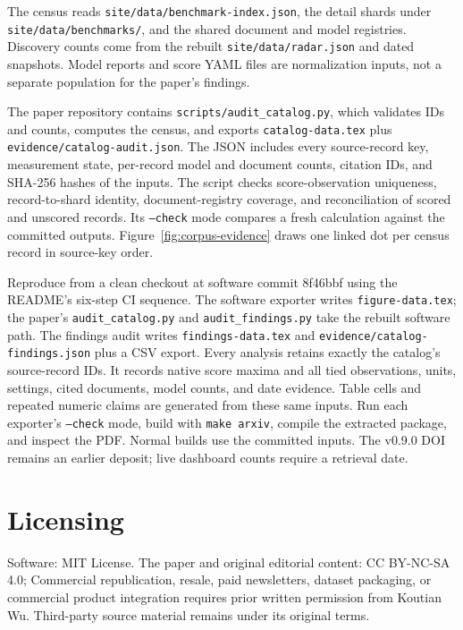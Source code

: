 \documentclass[11pt]{article}
\newcommand{\gitcommit}{8f46bbf}
\begin{document}
The census reads \texttt{site/data/benchmark-index.json}, the detail shards under \texttt{site/data/benchmarks/}, and the shared document and model registries. Discovery counts come from the rebuilt \texttt{site/data/radar.json} and dated snapshots. Model reports and score YAML files are normalization inputs, not a separate population for the paper's findings.

The paper repository contains \texttt{scripts/audit\_catalog.py}, which validates IDs and counts, computes the census, and exports \texttt{catalog-data.tex} plus \texttt{evidence/catalog-audit.json}. The JSON includes every source-record key, measurement state, per-record model and document counts, citation IDs, and SHA-256 hashes of the inputs. The script checks score-observation uniqueness, record-to-shard identity, document-registry coverage, and reconciliation of scored and unscored records. Its \texttt{--check} mode compares a fresh calculation against the committed outputs. Figure~\ref{fig:corpus-evidence} draws one linked dot per census record in source-key order.

Reproduce from a clean checkout at software commit \gitcommit{} using the README's six-step CI sequence. The software exporter writes \texttt{figure-data.tex}; the paper's \texttt{audit\_catalog.py} and \texttt{audit\_findings.py} take the rebuilt software path. The findings audit writes \texttt{findings-data.tex} and \texttt{evidence/catalog-findings.json} plus a CSV export. Every analysis retains exactly the catalog's source-record IDs. It records native score maxima and all tied observations, units, settings, cited documents, model counts, and date evidence. Table cells and repeated numeric claims are generated from these same inputs. Run each exporter's \texttt{--check} mode, build with \texttt{make arxiv}, compile the extracted package, and inspect the PDF. Normal builds use the committed inputs. The v0.9.0 DOI remains an earlier deposit; live dashboard counts require a retrieval date.

\section*{Licensing}
Software: MIT License. The paper and original editorial content: CC BY-NC-SA 4.0;
Commercial republication, resale, paid newsletters, dataset packaging, or commercial
product integration requires prior written permission from Koutian Wu. Third-party
source material remains under its original terms.
\end{document}

